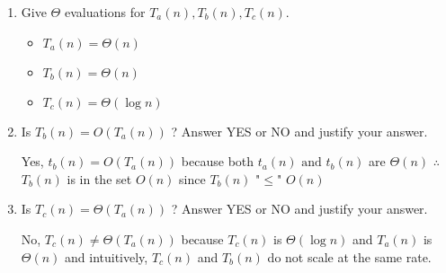 \documentclass[11pt]{article}
\begin{document}
\begin{enumerate}
	\item  Give $\Theta$ evaluations for   $T_a(n), T_b(n), T_c(n)$.
	      \begin{itemize}[noitemsep,topsep=0pt]
		      \item \(T_{a}(n) = \Theta(n)\)
		      \item \(T_{b}(n) = \Theta(n)\)
		      \item \(T_{c}(n) = \Theta(\log{n} )\)
	      \end{itemize}
	\item Is  $T_b(n)  = O(T_a(n))$ ? Answer YES or NO and justify your answer. \par
	      \vspace{1mm}
	      Yes, \(t_{b}(n) = O(T_{a}(n))\) because both \(t_{a}(n) \text{ and } t_{b}(n)\)  are  $\Theta(n)$ $\therefore$ \(T_b(n)\) is in the set \(O(n)\) since \(T_b(n)\) "$\leq$" \(O(n)\)
	\item  Is $T_c(n) = \Theta (T_a(n))$ ?  Answer YES or NO and justify your answer. \par
	      \vspace{1mm}
	      No, $T_c(n) \neq \Theta (T_a(n))$ because $T_c(n)$ is $\Theta(\log {n})$ and
       $T_a(n)$ is $\Theta(n)$ and intuitively, \(T_c(n)\) and \(T_b(n)\) do not scale at the same rate.

\end{enumerate}
\newpage
\end{document}
